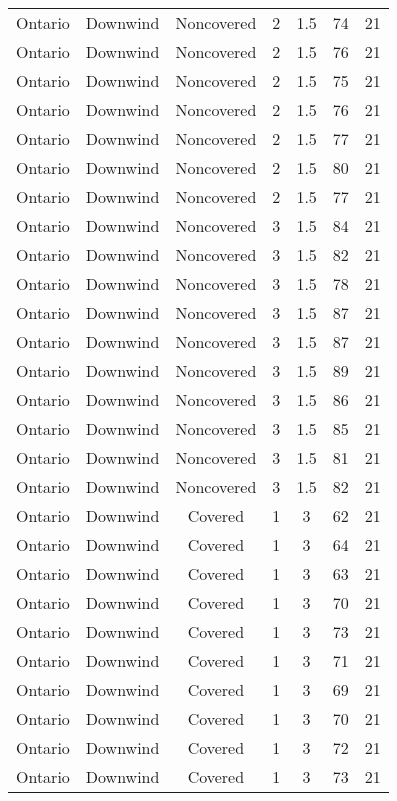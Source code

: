 \documentclass{article}
\begin{document}
\begin{longtable}[H]{ccccccc}
Ontario & Downwind & Noncovered & 2 & 1.5  & 74  & 21 \\
Ontario & Downwind & Noncovered & 2 & 1.5  & 76  & 21 \\
Ontario & Downwind & Noncovered & 2 & 1.5  & 75  & 21 \\
Ontario & Downwind & Noncovered & 2 & 1.5  & 76  & 21 \\
Ontario & Downwind & Noncovered & 2 & 1.5  & 77  & 21 \\
Ontario & Downwind & Noncovered & 2 & 1.5  & 80  & 21 \\
Ontario & Downwind & Noncovered & 2 & 1.5  & 77  & 21 \\
Ontario & Downwind & Noncovered & 3 & 1.5  & 84  & 21 \\
Ontario & Downwind & Noncovered & 3 & 1.5  & 82  & 21 \\
Ontario & Downwind & Noncovered & 3 & 1.5  & 78  & 21 \\
Ontario & Downwind & Noncovered & 3 & 1.5  & 87  & 21 \\
Ontario & Downwind & Noncovered & 3 & 1.5  & 87  & 21 \\
Ontario & Downwind & Noncovered & 3 & 1.5  & 89  & 21 \\
Ontario & Downwind & Noncovered & 3 & 1.5  & 86  & 21 \\
Ontario & Downwind & Noncovered & 3 & 1.5  & 85  & 21 \\
Ontario & Downwind & Noncovered & 3 & 1.5  & 81  & 21 \\
Ontario & Downwind & Noncovered & 3 & 1.5  & 82  & 21 \\
Ontario & Downwind & Covered     & 1 & 3    & 62  & 21 \\
Ontario & Downwind & Covered     & 1 & 3    & 64  & 21 \\
Ontario & Downwind & Covered     & 1 & 3    & 63  & 21 \\
Ontario & Downwind & Covered     & 1 & 3    & 70  & 21 \\
Ontario & Downwind & Covered     & 1 & 3    & 73  & 21 \\
Ontario & Downwind & Covered     & 1 & 3    & 71  & 21 \\
Ontario & Downwind & Covered     & 1 & 3    & 69  & 21 \\
Ontario & Downwind & Covered     & 1 & 3    & 70  & 21 \\
Ontario & Downwind & Covered     & 1 & 3    & 72  & 21 \\
Ontario & Downwind & Covered     & 1 & 3    & 73  & 21 \\

\end{longtable}
\end{document}
